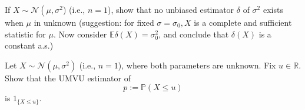 \begin{exercise}
    If \(X \sim \mathcal{N}\left(\mu, \sigma^{2}\right.\)) (i.e., \(n=1\)), show that no unbiased estimator \(\delta\) of \(\sigma^{2}\) exists when \(\mu\) in unknown (suggestion: for fixed \(\sigma=\sigma_{0}, X\) is a complete and sufficient statistic for \(\mu\). Now consider \(\mathbb{E} \delta(X)=\sigma_{0}^{2}\), and conclude that \(\delta(X)\) is a constant a.s.)
\end{exercise}

\begin{exercise}
    Let \(X \sim \mathcal{N}\left(\mu, \sigma^{2}\right)\) (i.e., \(n=1\)), where both parameters are unknown. Fix \(u \in \mathbb{R}\). Show that the UMVU estimator of
    \[
    p:=\mathbb{P}(X \leq u)
    \]
    is \(1_{\{X \leq u\}}\). 
\end{exercise}

